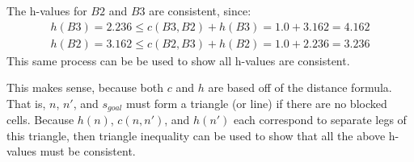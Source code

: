 \documentclass[12pt]{article}
\begin{document}
\begin{enumerate}[label={\large\textbf{\alph*)}}]

The h-values for $B2$ and $B3$ are consistent, since:
\begin{align*}
h(B3) = 2.236 \le c(B3, B2) + h(B3) = 1.0 + 3.162 = 4.162 \\
h(B2) = 3.162 \le c(B2, B3) + h(B2) = 1.0 + 2.236 = 3.236
\end{align*}
This same process can be be used to show all h-values are consistent.

This makes sense, because both $c$ and $h$ are based off of the distance formula.
That is, $n$, $n'$, and $s_{goal}$ must form a triangle (or line) if there are no blocked cells.
Because $h(n)$, $c(n, n')$, and $h(n')$ each correspond to separate legs of this triangle,
then triangle inequality can be used to show that all the above h-values must be consistent.

\end{enumerate}
\end{document}
